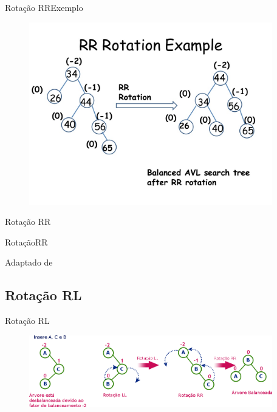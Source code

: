 \documentclass[aspectratio=169]{beamer}
\begin{document}
\begin{frame}{Rotação RR}{Exemplo}
\begin{figure}[!h]
  \centering
  \includegraphics[width=300pt]{imagens/rr_rotation_example1.png}
  \label{fig_rr_rotation_example1}
\end{figure}
\end{frame}


\begin{frame}{Rotação RR}
\begin{algorithm}[H]
\caption{RotaçãoRR} 
\label{RotacaoRR}
\end{algorithm}
\tiny{Adaptado de \cite{Backes2016}}  
\end{frame}

\subsection{Rotação RL}

\begin{frame}{Rotação RL}
\begin{figure}[!h]
  \centering
   \includegraphics[width=300pt]{imagens/rotacao_rl.png}
  \label{fig_rotacao_rl}
\end{figure}
\end{frame}
\end{document}
